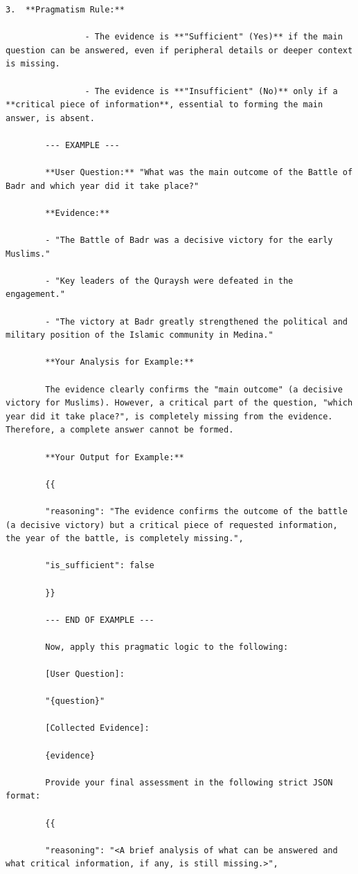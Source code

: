 \documentclass[11pt]{article}
\begin{document}
\begin{lstlisting}[basicstyle=\scriptsize\ttfamily]
        3.  **Pragmatism Rule:**

                - The evidence is **"Sufficient" (Yes)** if the main question can be answered, even if peripheral details or deeper context is missing.

                - The evidence is **"Insufficient" (No)** only if a **critical piece of information**, essential to forming the main answer, is absent.

        --- EXAMPLE ---

        **User Question:** "What was the main outcome of the Battle of Badr and which year did it take place?"

        **Evidence:**

        - "The Battle of Badr was a decisive victory for the early Muslims."

        - "Key leaders of the Quraysh were defeated in the engagement."

        - "The victory at Badr greatly strengthened the political and military position of the Islamic community in Medina."

        **Your Analysis for Example:**

        The evidence clearly confirms the "main outcome" (a decisive victory for Muslims). However, a critical part of the question, "which year did it take place?", is completely missing from the evidence. Therefore, a complete answer cannot be formed.

        **Your Output for Example:**

        {{

        "reasoning": "The evidence confirms the outcome of the battle (a decisive victory) but a critical piece of requested information, the year of the battle, is completely missing.",

        "is_sufficient": false

        }}

        --- END OF EXAMPLE ---

        Now, apply this pragmatic logic to the following:

        [User Question]:

        "{question}"

        [Collected Evidence]:

        {evidence}

        Provide your final assessment in the following strict JSON format:

        {{

        "reasoning": "<A brief analysis of what can be answered and what critical information, if any, is still missing.>",


\end{lstlisting}
\end{document}
